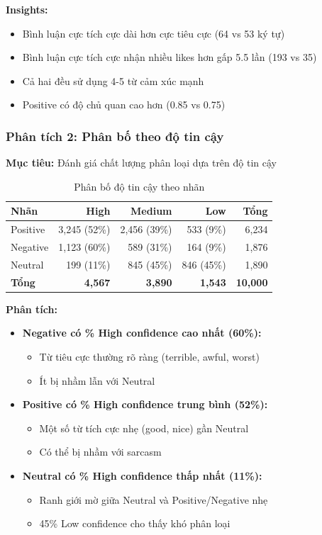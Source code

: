 \textbf{Insights:}
\begin{itemize}
    \item Bình luận cực tích cực dài hơn cực tiêu cực (64 vs 53 ký tự)
    \item Bình luận cực tích cực nhận nhiều likes hơn gấp 5.5 lần (193 vs 35)
    \item Cả hai đều sử dụng 4-5 từ cảm xúc mạnh
    \item Positive có độ chủ quan cao hơn (0.85 vs 0.75)
\end{itemize}

\subsubsection{Phân tích 2: Phân bố theo độ tin cậy}

\textbf{Mục tiêu:} Đánh giá chất lượng phân loại dựa trên độ tin cậy

\begin{table}[H]
\centering
\caption{Phân bố độ tin cậy theo nhãn}
\begin{tabular}{|l|r|r|r|r|}
\hline
\textbf{Nhãn} & \textbf{High} & \textbf{Medium} & \textbf{Low} & \textbf{Tổng} \\
\hline
Positive & 3,245 (52\%) & 2,456 (39\%) & 533 (9\%) & 6,234 \\
\hline
Negative & 1,123 (60\%) & 589 (31\%) & 164 (9\%) & 1,876 \\
\hline
Neutral & 199 (11\%) & 845 (45\%) & 846 (45\%) & 1,890 \\
\hline
\textbf{Tổng} & \textbf{4,567} & \textbf{3,890} & \textbf{1,543} & \textbf{10,000} \\
\hline
\end{tabular}
\end{table}

\textbf{Phân tích:}
\begin{itemize}
    \item \textbf{Negative có \% High confidence cao nhất (60\%):}
    \begin{itemize}
        \item Từ tiêu cực thường rõ ràng (terrible, awful, worst)
        \item Ít bị nhầm lẫn với Neutral
    \end{itemize}
    
    \item \textbf{Positive có \% High confidence trung bình (52\%):}
    \begin{itemize}
        \item Một số từ tích cực nhẹ (good, nice) gần Neutral
        \item Có thể bị nhầm với sarcasm
    \end{itemize}
    
    \item \textbf{Neutral có \% High confidence thấp nhất (11\%):}
    \begin{itemize}
        \item Ranh giới mờ giữa Neutral và Positive/Negative nhẹ
        \item 45\% Low confidence cho thấy khó phân loại
    \end{itemize}
\end{itemize}

